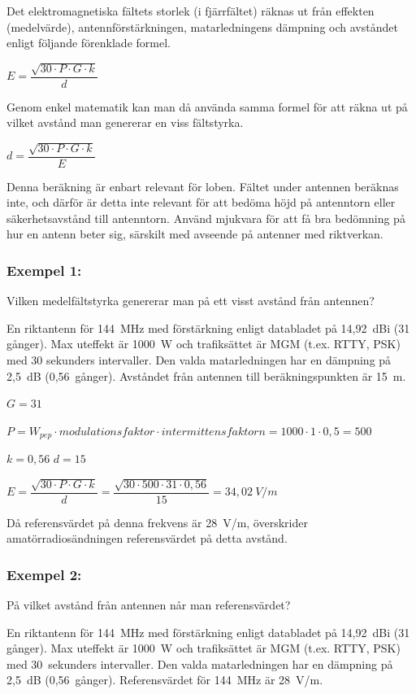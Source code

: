 Det elektromagnetiska fältets storlek (i fjärrfältet) räknas ut från
effekten (medelvärde), antennförstärkningen, matarledningens dämpning
och avståndet enligt följande förenklade formel.

\(E=\dfrac{\sqrt{30 \cdot P \cdot G \cdot k}}{d}\)

Genom enkel matematik kan man då använda samma formel för att räkna
ut på vilket avstånd man genererar en viss fältstyrka.

\(d=\dfrac{\sqrt{30 \cdot P \cdot G \cdot k}}{E}\)

Denna beräkning är enbart relevant för loben. Fältet under antennen
beräknas inte, och därför är detta inte relevant för att bedöma höjd
på antenntorn eller säkerhetsavstånd till antenntorn.
Använd mjukvara för att få bra bedömning på hur en antenn beter sig, särskilt
med avseende på antenner med riktverkan.

\subsubsection{Exempel 1:}

Vilken medelfältstyrka genererar man på ett visst avstånd från antennen?

En riktantenn för 144~MHz med förstärkning enligt databladet på
14,92~dBi (31 gånger).
Max uteffekt är 1000~W och trafiksättet är MGM (t.ex. RTTY, PSK) med
30 sekunders intervaller.
Den valda matarledningen har en dämpning på 2,5~dB (0,56~gånger).
Avståndet från antennen till beräkningspunkten är 15~m.

\(G = 31\)

\(P = W_{pep} \cdot modulationsfaktor \cdot intermittensfaktorn
= 1000 \cdot 1 \cdot 0,5 = 500\)

\(k = 0,56\)
\(d = 15\)

\(E = \dfrac{\sqrt{30 \cdot P \cdot G \cdot k}}{d}
= \dfrac{\sqrt{30 \cdot 500 \cdot 31 \cdot 0,56}}{15}
= 34,02\ V/m\)

Då referensvärdet på denna frekvens är 28~V/m, överskrider
amatörradiosändningen referensvärdet på detta avstånd.

\subsubsection{Exempel 2:}

På vilket avstånd från antennen når man referensvärdet?

En riktantenn för 144~MHz med förstärkning enligt databladet på
14,92~dBi (31 gånger).
Max uteffekt är 1000~W och trafiksättet är MGM (t.ex. RTTY, PSK) med
30~sekunders intervaller.
Den valda matarledningen har en dämpning på 2,5~dB (0,56~gånger).
Referensvärdet för 144~MHz är 28~V/m.


